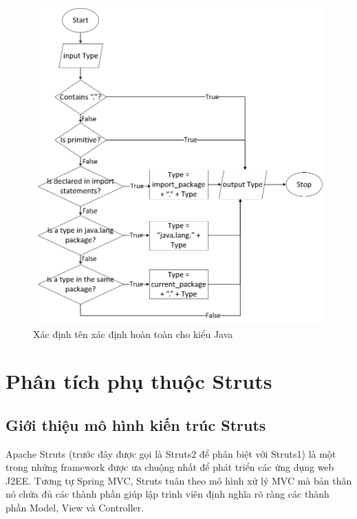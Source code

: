 \documentclass[12pt]{report}
\begin{document}
\begin{figure}[h]
	\centering
	\includegraphics[scale=0.6]{fqn-type}
	\caption{Xác định tên xác định hoàn toàn cho kiểu Java}
	\label{fig:fqn-type}
\end{figure}

\section{Phân tích phụ thuộc Struts}
\subsection{Giới thiệu mô hình kiến trúc Struts}
Apache Struts (trước đây được gọi là Struts2 để phân biệt với Struts1) là một trong những framework được ưa chuộng nhất để phát triển các ứng dụng web J2EE. Tương tự Spring MVC, Struts tuân theo mô hình xử lý MVC mà bản thân nó chứa đủ các thành phần giúp lập trình viên định nghĩa rõ ràng các thành phần Model, View và Controller.
\end{document}
